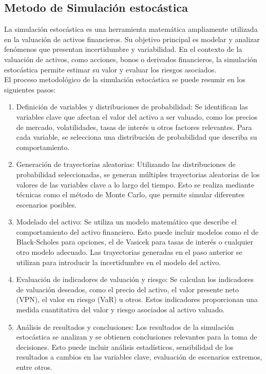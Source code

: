 \subsection{Metodo de Simulación estocástica}

La simulación estocástica es una herramienta matemática ampliamente utilizada en la valuación de activos financieros. Su objetivo principal es modelar y analizar fenómenos que presentan incertidumbre y variabilidad. En el contexto de la valuación de activos, como acciones, bonos o derivados financieros, la simulación estocástica permite estimar su valor y evaluar los riesgos asociados.\\

El proceso metodológico de la simulación estocástica se puede resumir en los siguientes pasos:

\begin{enumerate}
 \item Definición de variables y distribuciones de probabilidad: Se identifican las variables clave que afectan el valor del activo a ser valuado, como los precios de mercado, volatilidades, tasas de interés u otros factores relevantes. Para cada variable, se selecciona una distribución de probabilidad que describa su comportamiento.

\item Generación de trayectorias aleatorias: Utilizando las distribuciones de probabilidad seleccionadas, se generan múltiples trayectorias aleatorias de los valores de las variables clave a lo largo del tiempo. Esto se realiza mediante técnicas como el método de Monte Carlo, que permite simular diferentes escenarios posibles.

\item Modelado del activo: Se utiliza un modelo matemático que describe el comportamiento del activo financiero. Esto puede incluir modelos como el de Black-Scholes para opciones, el de Vasicek para tasas de interés o cualquier otro modelo adecuado. Las trayectorias generadas en el paso anterior se utilizan para introducir la incertidumbre en el modelo del activo.

\item Evaluación de indicadores de valuación y riesgo: Se calculan los indicadores de valuación deseados, como el precio del activo, el valor presente neto (VPN), el valor en riesgo (VaR) u otros. Estos indicadores proporcionan una medida cuantitativa del valor y riesgo asociados al activo valuado.

\item Análisis de resultados y conclusiones: Los resultados de la simulación estocástica se analizan y se obtienen conclusiones relevantes para la toma de decisiones. Esto puede incluir análisis estadísticos, sensibilidad de los resultados a cambios en las variables clave, evaluación de escenarios extremos, entre otros.

\end{enumerate}

